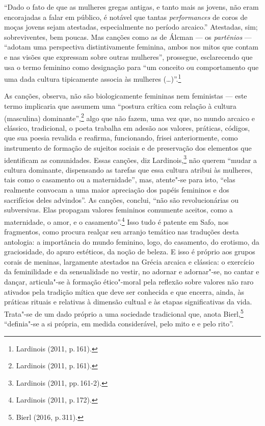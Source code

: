``Dado o fato de que as mulheres gregas antigas, e tanto mais as jovens, não eram encorajadas a falar em público, é notável que tantas \textit{performances} de coros de moças jovens sejam atestadas, especialmente no período arcaico.''
Atestadas, sim; sobreviventes, bem poucas. Mas canções como as de Álcman --- os \textit{partênios} --- ``adotam uma perspectiva distintivamente feminina, ambos nos mitos que contam e nas visões que expressam sobre outras mulheres'', prossegue, esclarecendo que usa o termo feminino como designação para ``um conceito ou comportamento que uma dada cultura tipicamente associa às mulheres (\ldots{})''.\footnote{Lardinois (2011, p.\,161).}

As canções, observa, não são biologicamente femininas nem feministas --- este termo implicaria que assumem uma “postura crítica com relação à cultura (masculina) dominante”,\footnote{Lardinois (2011, p.\,161).} algo que não fazem, uma vez que, no mundo arcaico e clássico, tradicional, o poeta trabalha em adesão aos valores, práticas, códigos, que sua poesia revalida e reafirma, funcionando, frisei anteriormente, como instrumento de formação de sujeitos sociais e de preservação dos elementos que identificam as comunidades. Essas canções, diz Lardinois,\footnote{Lardinois (2011, pp.\,161-2).} não querem “mudar a cultura dominante, dispensando as tarefas que essa cultura atribui às mulheres, tais como o casamento ou a maternidade”, mas, atente"-se para isto, “elas realmente convocam a uma maior apreciação dos papéis femininos e dos sacrifícios deles advindos”. As canções, conclui, “não são revolucionárias ou subversivas. Elas propagam valores femininos comumente aceitos, como a maternidade, o amor, e o casamento”.\footnote{Lardinois (2011, p.\,172).} Isso tudo é patente em Safo, nos fragmentos, como procura realçar seu arranjo temático nas traduções desta antologia: a importância do mundo feminino, logo, do casamento, do erotismo, da graciosidade, do apuro estéticos, da noção de beleza. E isso é próprio aos grupos corais de meninas, largamente atestados na Grécia arcaica e clássica: o exercício da feminilidade e da sensualidade no vestir, no adornar e adornar"-se, no cantar e dançar, articula"-se à formação ético"-moral pela reflexão sobre valores não raro ativados pela tradição mítica que deve ser conhecida e que encerra, ainda, às práticas rituais e relativas à dimensão cultual e às etapas significativas da vida. Trata"-se de um dado próprio a uma sociedade tradicional que, anota Bierl,\footnote{Bierl (2016, p.\,311).} “definia"-se a si própria, em medida considerável, pelo mito e e pelo rito”. 


